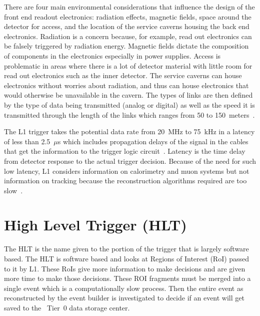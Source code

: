There are four main environmental considerations that influence the design of the front end readout electronics: radiation effects, magnetic fields, space around the detector for access, and the location of the service caverns housing the back end electronics. Radiation is a concern because, for example, read out electronics can be falsely triggered by radiation energy. Magnetic fields dictate the composition of components in the electronics especially in power supplies. Access is problematic in areas where there is a lot of detector material with little room for read out electronics such as the inner detector. The service caverns can house electronics without worries about radiation, and thus can house electronics that would otherwise be unavailable in the cavern. The types of links are then defined by the type of data being transmitted (analog or digital) as well as the speed it is transmitted through the length of the links which ranges from 50 to 150~meters~\cite{Green:1221848,DETECTORS}.

The L1 trigger takes the potential data rate from 20~MHz to 75~kHz in a latency of less than 2.5~$\mu$s which includes propagation delays of the signal in the cables that get the information to the trigger logic circuit~\cite{Green:1221848}. Latency is the time delay from detector response to the actual trigger decision. Because of the need for such low latency, L1 considers information on calorimetry and muon systems but not information on tracking because the reconstruction algorithms required are too slow~\cite{DETECTORS}.


\section{High Level Trigger (HLT)}
\label{SECTION-TRIGGERS-HLT}

The HLT is the name given to the portion of the trigger that is largely software based. The HLT is software based and looks at Regions of Interest (RoI) passed to it by L1. These RoIs give more information to make decisions and are given more time to make those decisions. These ROI fragments must be merged into a single event which is a computationally slow process. Then the entire event as reconstructed by the event builder is investigated to decide if an event will get saved to the \atlas~Tier~0 data storage center. 


